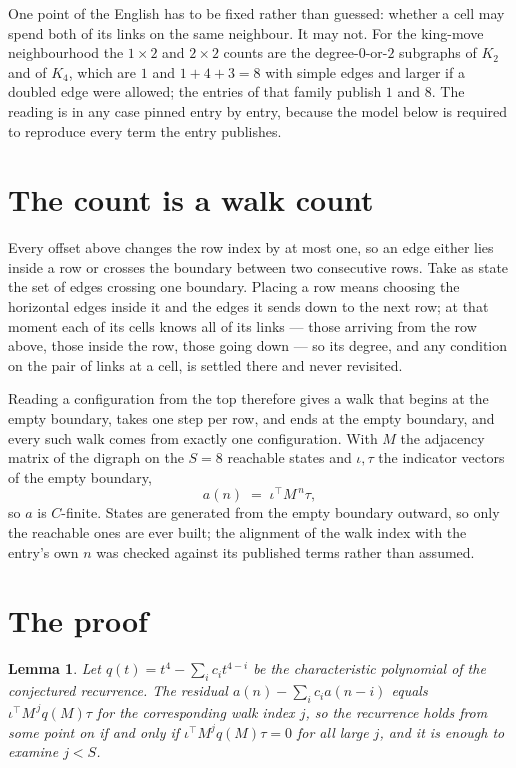 \documentclass[11pt,a4paper]{article}
\theoremstyle{plain}
\newtheorem{lemma}[theorem]{Lemma}
\theoremstyle{definition}
\begin{document}
One point of the English has to be fixed rather than guessed: whether a cell may spend both of
its links on the same neighbour. It may not. For the king-move neighbourhood the $1\times2$
and $2\times2$ counts are the degree-$0$-or-$2$ subgraphs of $K_2$ and of $K_4$, which are $1$
and $1+4+3=8$ with simple edges and larger if a doubled edge were allowed; the entries of that
family publish $1$ and $8$. The reading is in any case pinned entry by entry, because the
model below is required to reproduce every term the entry publishes.


\section{The count is a walk count}

Every offset above changes the row index by at most one, so an edge either lies inside a row
or crosses the boundary between two consecutive rows. Take as state the set of edges crossing
one boundary. Placing a row means choosing the horizontal edges inside it and the edges it
sends down to the next row; at that moment each of its cells knows all of its links --- those
arriving from the row above, those inside the row, those going down --- so its degree, and any
condition on the pair of links at a cell, is settled there and never revisited.

Reading a configuration from the top therefore gives a walk that begins at the empty boundary,
takes one step per row, and ends at the empty boundary, and every such walk comes from exactly
one configuration. With $M$ the adjacency matrix of the digraph on the $S=8$ reachable
states and $\iota,\tau$ the indicator vectors of the empty boundary,
\[
a(n)\;=\;\iota^{\!\top}M^{\,n}\tau ,
\]
so $a$ is $C$-finite. States are generated from the empty boundary outward, so only the
reachable ones are ever built; the alignment of the walk index with the entry's own $n$ was
checked against its published terms rather than assumed.

\section{The proof}

\begin{lemma}\label{lem:crit}
Let $q(t)=t^{4}-\sum_i c_it^{4-i}$ be the characteristic polynomial of the
conjectured recurrence. The residual $a(n)-\sum_ic_ia(n-i)$ equals
$\iota^{\!\top}M^{\,j}q(M)\tau$ for the corresponding walk index $j$, so the recurrence
holds from some point on if and only if $\iota^{\!\top}M^{j}q(M)\tau=0$ for all large $j$,
and it is enough to examine $j<S$.
\end{lemma}
\end{document}
